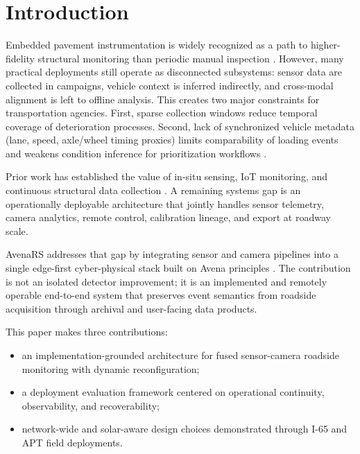\documentclass[conference]{IEEEtran}
\begin{document}
\section{Introduction}
Embedded pavement instrumentation is widely recognized as a path to higher-fidelity structural monitoring than periodic manual inspection \cite{Barriera2020SituPavementMonitoring, Xin2025}. However, many practical deployments still operate as disconnected subsystems: sensor data are collected in campaigns, vehicle context is inferred indirectly, and cross-modal alignment is left to offline analysis. This creates two major constraints for transportation agencies. First, sparse collection windows reduce temporal coverage of deterioration processes. Second, lack of synchronized vehicle metadata (lane, speed, axle/wheel timing proxies) limits comparability of loading events and weakens condition inference for prioritization workflows \cite{Jha2023DataDrivenWeb}.

Prior work has established the value of in-situ sensing, IoT monitoring, and continuous structural data collection \cite{Xue2014PavementHealthMonitoring, Alavi2016Continuoushealthmonitoring, Ceylan2016FieldDemo, Micko2023, Liu2024SensorBasedStructural, Ye2024}. A remaining systems gap is an operationally deployable architecture that jointly handles sensor telemetry, camera analytics, remote control, calibration lineage, and export at roadway scale.

AvenaRS addresses that gap by integrating sensor and camera pipelines into a single edge-first cyber-physical stack built on Avena principles \cite{avena2022, castiblanco2024avena, castiblanco2024oatsmobile, gowda2025enhancing}. The contribution is not an isolated detector improvement; it is an implemented and remotely operable end-to-end system that preserves event semantics from roadside acquisition through archival and user-facing data products.

This paper makes three contributions:
\begin{itemize}
\item an implementation-grounded architecture for fused sensor-camera roadside monitoring with dynamic reconfiguration;
\item a deployment evaluation framework centered on operational continuity, observability, and recoverability;
\item network-wide and solar-aware design choices demonstrated through I-65 and APT field deployments.
\end{itemize}
\end{document}
